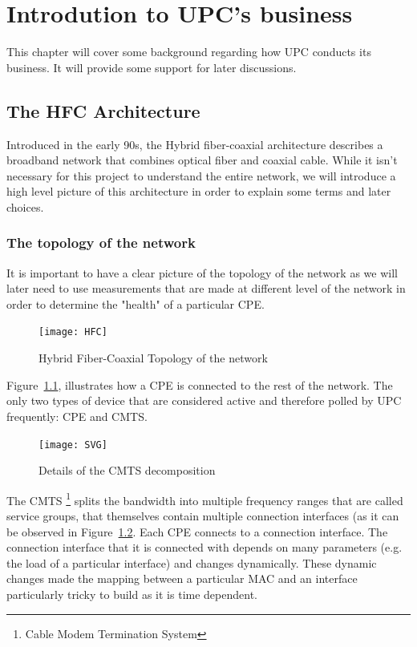 \chapter{Introdution to UPC's business}
This chapter will cover some background regarding how UPC conducts its business. It will provide some support for later discussions.

\section{The HFC Architecture}
Introduced in the early 90s, the Hybrid fiber-coaxial\cite{wiki:hfc} architecture describes a broadband network that combines optical fiber and coaxial cable. While it isn't necessary for this project to understand the entire network, we will introduce a high level picture of this architecture in order to explain some terms and later choices.

\subsection{The topology of the network}
It is important to have a clear picture of the topology of the network as we will later need to use measurements that are made at different level of the network in order to determine the "health" of a particular CPE.

\begin{figure}[ht]
    \begin{center}
    \texttt{[image: HFC]}
    \end{center}
    \caption{Hybrid Fiber-Coaxial Topology of the network}
    \label{HFC}
\end{figure}

Figure~\ref{HFC}, illustrates how a CPE is connected to the rest of the network. The only two types of device that are considered active and therefore polled by UPC frequently: CPE and CMTS. 

\begin{figure}[ht]
    \begin{center}
    \texttt{[image: SVG]}
    \end{center}
    \caption{Details of the CMTS decomposition}
    \label{SVG}
\end{figure}

The CMTS \footnote{Cable Modem Termination System} splits the bandwidth into multiple frequency ranges that are called service groups, that themselves contain multiple connection interfaces (as it can be observed in Figure~\ref{SVG}. Each CPE connects to a connection interface. The connection interface that it is connected with depends on many parameters (e.g. the load of a particular interface) and changes dynamically. These dynamic changes made the mapping between a particular MAC and an interface particularly tricky to build as it is time dependent. 

